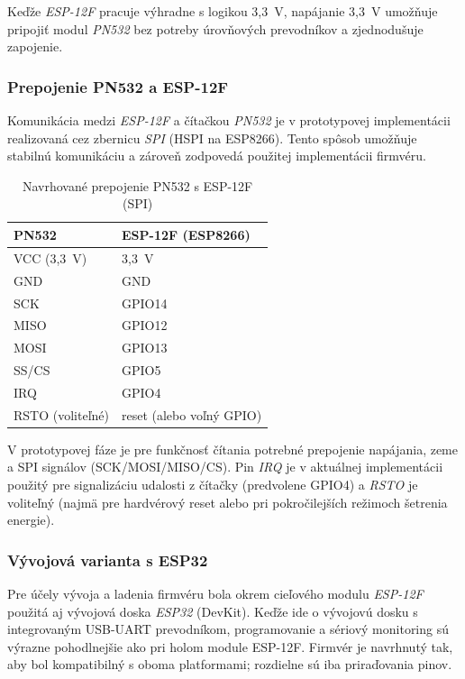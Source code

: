 Keďže \textit{ESP-12F} pracuje výhradne s logikou 3,3~V, napájanie 3,3~V umožňuje pripojiť modul \textit{PN532} bez potreby úrovňových prevodníkov a zjednodušuje zapojenie.

\subsubsection{Prepojenie PN532 a ESP-12F}
Komunikácia medzi \textit{ESP-12F} a čítačkou \textit{PN532} je v prototypovej implementácii realizovaná cez zbernicu \textit{SPI} (HSPI na ESP8266). Tento spôsob umožňuje stabilnú komunikáciu a zároveň zodpovedá použitej implementácii firmvéru.

\begin{table}[h!]
  \centering
  \caption{Navrhované prepojenie PN532 s ESP-12F (SPI)}
  \label{tab:pn532-esp12f-wiring}
  \begin{tabular}{ll}
    \toprule
    PN532 & ESP-12F (ESP8266) \\
    \midrule
    VCC (3,3~V) & 3,3~V \\
    GND & GND \\
    SCK & GPIO14 \\
    MISO & GPIO12 \\
    MOSI & GPIO13 \\
    SS/CS & GPIO5 \\
    IRQ & GPIO4 \\
    RSTO (voliteľné) & reset (alebo voľný GPIO) \\
    \bottomrule
  \end{tabular}
\end{table}

V prototypovej fáze je pre funkčnosť čítania potrebné prepojenie napájania, zeme a SPI signálov (SCK/MOSI/MISO/CS). Pin \textit{IRQ} je v aktuálnej implementácii použitý pre signalizáciu udalosti z čítačky (predvolene GPIO4) a \textit{RSTO} je voliteľný (najmä pre hardvérový reset alebo pri pokročilejších režimoch šetrenia energie).

\subsubsection{Vývojová varianta s ESP32}
Pre účely vývoja a ladenia firmvéru bola okrem cieľového modulu \textit{ESP-12F} použitá aj vývojová doska \textit{ESP32} (DevKit). Keďže ide o vývojovú dosku s integrovaným USB-UART prevodníkom, programovanie a sériový monitoring sú výrazne pohodlnejšie ako pri holom module ESP-12F. Firmvér je navrhnutý tak, aby bol kompatibilný s oboma platformami; rozdielne sú iba priraďovania pinov.

